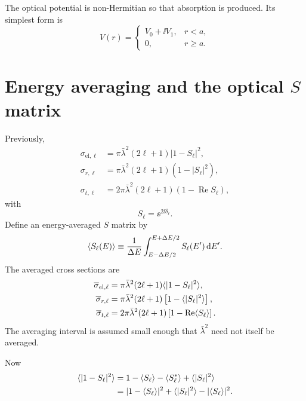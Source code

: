 The optical potential is non-Hermitian so that absorption is produced.  Its simplest form is
\[
  V(r)=
  \begin{cases}
    V_0+\ii V_1, & r<a,\\
    0, & r\ge a.
  \end{cases}
\]

\section{Energy averaging and the optical \texorpdfstring{$S$}{S} matrix}
Previously,
\begin{align*}
  \sigma_{\mathrm{el},\ell}
  &=\pi\bar\lambda^2(2\ell+1)|1-S_\ell|^2,\\
  \sigma_{r,\ell}
  &=\pi\bar\lambda^2(2\ell+1)(1-|S_\ell|^2),\\
  \sigma_{t,\ell}
  &=2\pi\bar\lambda^2(2\ell+1)(1-\operatorname{Re}S_\ell),
\end{align*}
with
\[
  S_\ell=\ee^{2\ii\delta_\ell}.
\]
Define an energy-averaged $S$ matrix by
\begin{equation}
  \langle S_\ell(E)\rangle
  \equiv\frac{1}{\Delta E}
  \int_{E-\Delta E/2}^{E+\Delta E/2}S_\ell(E')\,\mathrm{d} E'.
  \label{eq:om-average-S}
\end{equation}
The averaged cross sections are
\begin{align*}
  \overline\sigma_{\mathrm{el},\ell}
  &=\pi\bar\lambda^2(2\ell+1)\langle |1-S_\ell|^2\rangle,\\
  \overline\sigma_{r,\ell}
  &=\pi\bar\lambda^2(2\ell+1)\left[1-\langle |S_\ell|^2\rangle\right],\\
  \overline\sigma_{t,\ell}
  &=2\pi\bar\lambda^2(2\ell+1)
  \left[1-\operatorname{Re}\langle S_\ell\rangle\right].
\end{align*}
The averaging interval is assumed small enough that $\bar\lambda^2$ need not itself be averaged.

Now
\begin{align*}
  \langle |1-S_\ell|^2\rangle
  &=1-\langle S_\ell\rangle-\langle S_\ell^*\rangle+\langle |S_\ell|^2\rangle\\
  &=|1-\langle S_\ell\rangle|^2
  +\langle |S_\ell|^2\rangle-|\langle S_\ell\rangle|^2.
\end{align*}

